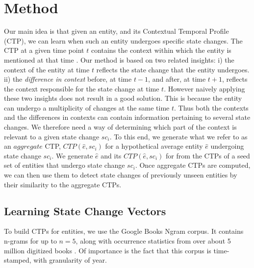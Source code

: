 \documentclass[11pt,a4paper]{article}
\renewcommand{\paragraph}[1]{\noindent\textbf{#1.}}
\newcommand{\highlight}[1]{{\color{red} #1}}
\begin{document}

\section{Method}
Our main idea is that given an entity, and its Contextual Temporal Profile (CTP), we can learn 
when such an entity undergoes  specific state changes. The CTP at a given time point $t$ contains the context  within which the entity is mentioned at that time . Our method is based on two related insights: i)  the context of the entity at time $t$  reflects the state change that the entity undergoes.  ii) the   \textit{difference in context} before, at time $t-1$, and after, at time $t+1$,  reflects the context responsible for the state change at time $t$.  However naively applying these two insights does not result in a good solution. This is because the entity can undergo a multiplicity of changes at the same time  $t$. Thus both the contexts and the differences in contexts can contain information  pertaining to several state changes. We therefore need a way of determining which part of the context is relevant to a given state change $sc_i$. To this end, we generate what we refer to as an  $aggregate$ CTP, $CTP(\hat{e}, sc_i)$   for a hypothetical average entity $\hat{e}$ undergoing state change $sc_i$.  We generate $\hat{e}$ and its $CTP(\hat{e}, sc_i)$ for from the CTPs  of  a seed set of entities that undergo state change $sc_i$. Once aggregate CTPs are computed, we can then use them to detect state changes of previously unseen entities by their similarity to the aggregate CTPs.


\subsection{Learning  State Change Vectors}
To build CTPs for entities, we use the Google Books Ngram corpus.  It contains n-grams for up to $n=5$, along with occurrence statistics from over about 5 million digitized books \cite{Michel11}. Of importance is the fact that this corpus is time-stamped, with granularity of  year. 
\end{document}
